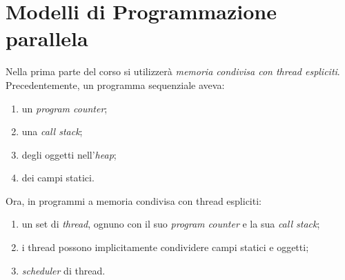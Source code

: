 \section{Modelli di Programmazione parallela}
Nella prima parte del corso si utilizzerà \textit{memoria condivisa con thread espliciti}. \\
Precedentemente, un programma sequenziale aveva:
\begin{enumerate}
	\item un \textit{program counter};
	\item una \textit{call stack};
	\item degli oggetti nell'\textit{heap};
	\item dei campi statici.
\end{enumerate}
Ora, in programmi a memoria condivisa con thread espliciti:
\begin{enumerate}
	\item un set di \textit{thread}, ognuno con il suo \textit{program counter} e la sua \textit{call stack};
	\item i thread possono implicitamente condividere campi statici e oggetti;
	\item \textit{scheduler} di thread.
\end{enumerate}
